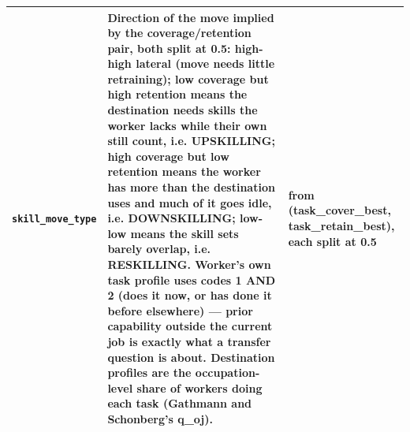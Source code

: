 \documentclass[10pt]{article}
\begin{document}
{\begin{longtable}{p{3.3cm}p{7.6cm}p{5.7cm}}
\texttt{skill\_move\_type} & Direction of the move implied by the coverage/retention pair, both split at 0.5: high-high lateral (move needs little retraining); low coverage but high retention means the destination needs skills the worker lacks while their own still count, i.e. UPSKILLING; high coverage but low retention means the worker has more than the destination uses and much of it goes idle, i.e. DOWNSKILLING; low-low means the skill sets barely overlap, i.e. RESKILLING. Worker's own task profile uses codes 1 AND 2 (does it now, or has done it before elsewhere) — prior capability outside the current job is exactly what a transfer question is about. Destination profiles are the occupation-level share of workers doing each task (Gathmann and Schonberg's q\_oj). & from (task\_cover\_best, task\_retain\_best), each split at 0.5 \\
\bottomrule
\end{longtable}
}
\end{document}
